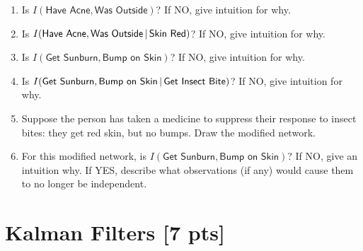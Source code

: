 \documentclass[submit]{harvardml}
\newcommand{\attr}[1]{\textsf{#1}}
\begin{document}
\begin{problem}
%
\begin{enumerate}
\item Is $I(\attr{Have Acne},\attr{Was Outside})$? If NO, give
intuition for why.
%
%
\item Is $I(\attr{Have Acne},\attr{Was Outside}\given \attr{Skin Red})$? If NO, give
intuition for why.
%
%
\item Is $I(\attr{Get Sunburn},\attr{Bump on Skin})$? If NO, give
intuition for why.
%
\item Is $I(\attr{Get Sunburn},\attr{Bump on Skin}\given \attr{Get Insect Bite})$? If NO, give intuition for why.
%
\item Suppose the person has taken a medicine to suppress their
  response to insect bites: they get red skin, but no bumps.  Draw the
  modified network.  
%
%
\item For this modified network, is $I(\attr{Get Sunburn},\attr{Bump
  on Skin})$? If NO, give an intuition why.  If YES, describe what
  observations (if any) would cause them to no longer be independent.    
%
\end{enumerate}
\end{problem}

\newpage

\section*{Kalman Filters [7 pts]}
\end{document}

